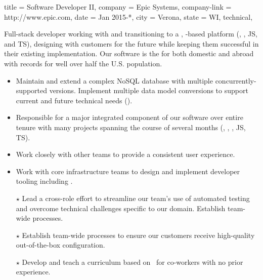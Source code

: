 \begin{position}
  {
    title   = Software Developer II,
    company = Epic Systems,
    company-link = http://www.epic.com,
    date    = Jan 2015-*,
    city    = Verona,
    state   = WI,
    technical,
  }

  Full-stack developer working with  and 
  transitioning to a , 
  -based platform (, \CSharp, JS, and TS),
  designing with customers for the future while keeping them
  successful in their existing implementation.  Our software is the
   for  both
  domestic and abroad \Dash with records for well over half the
  U.S. population.

  \medskip

\begin{itemize}
  \def\importantpoint{{\large$\star$\hspace*{-1pt}}}
\item Maintain and extend a complex NoSQL database with multiple
  concurrently-supported versions.  Implement multiple data model
  conversions to support current and future technical needs
  ().
\item Responsible for a major integrated component of our software
  over entire tenure \Dash with many projects spanning the course of
  several months (, , \CSharp, JS, TS).
\item Work closely with other teams to provide a consistent user
  experience.
\item Work with core infrastructure teams to design and implement
  developer tooling \Dash including .
\item[\importantpoint] Lead a cross-role effort to streamline our
  team's use of automated testing and overcome technical challenges
  specific to our domain.  Establish team-wide processes.
\item[\importantpoint] Establish team-wide processes to ensure our
  customers receive high-quality out-of-the-box configuration.
\item[\importantpoint] Develop and teach a curriculum based on
  \CSharp\ for co-workers with no prior experience.
\end{itemize}
\end{position}

